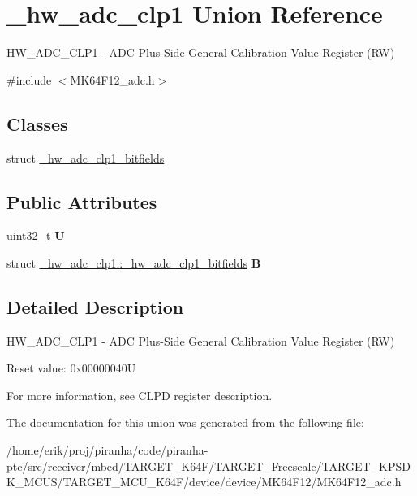 \hypertarget{union__hw__adc__clp1}{}\section{\+\_\+hw\+\_\+adc\+\_\+clp1 Union Reference}
\label{union__hw__adc__clp1}


H\+W\+\_\+\+A\+D\+C\+\_\+\+C\+L\+P1 -\/ A\+DC Plus-\/\+Side General Calibration Value Register (RW)  




{\ttfamily \#include $<$M\+K64\+F12\+\_\+adc.\+h$>$}

\subsection*{Classes}
\begin{DoxyCompactItemize}
\item 
struct \hyperlink{struct__hw__adc__clp1_1_1__hw__adc__clp1__bitfields}{\+\_\+hw\+\_\+adc\+\_\+clp1\+\_\+bitfields}
\end{DoxyCompactItemize}
\subsection*{Public Attributes}
\begin{DoxyCompactItemize}
\item 
uint32\+\_\+t {\bfseries U}\hypertarget{union__hw__adc__clp1_a59c69292c74fabab1ae97e84ba4952b6}{}\label{union__hw__adc__clp1_a59c69292c74fabab1ae97e84ba4952b6}

\item 
struct \hyperlink{struct__hw__adc__clp1_1_1__hw__adc__clp1__bitfields}{\+\_\+hw\+\_\+adc\+\_\+clp1\+::\+\_\+hw\+\_\+adc\+\_\+clp1\+\_\+bitfields} {\bfseries B}\hypertarget{union__hw__adc__clp1_aa9cb724d7a055535ba52fda75c87af63}{}\label{union__hw__adc__clp1_aa9cb724d7a055535ba52fda75c87af63}

\end{DoxyCompactItemize}


\subsection{Detailed Description}
H\+W\+\_\+\+A\+D\+C\+\_\+\+C\+L\+P1 -\/ A\+DC Plus-\/\+Side General Calibration Value Register (RW) 

Reset value\+: 0x00000040U

For more information, see C\+L\+PD register description. 

The documentation for this union was generated from the following file\+:\begin{DoxyCompactItemize}
\item 
/home/erik/proj/piranha/code/piranha-\/ptc/src/receiver/mbed/\+T\+A\+R\+G\+E\+T\+\_\+\+K64\+F/\+T\+A\+R\+G\+E\+T\+\_\+\+Freescale/\+T\+A\+R\+G\+E\+T\+\_\+\+K\+P\+S\+D\+K\+\_\+\+M\+C\+U\+S/\+T\+A\+R\+G\+E\+T\+\_\+\+M\+C\+U\+\_\+\+K64\+F/device/device/\+M\+K64\+F12/M\+K64\+F12\+\_\+adc.\+h\end{DoxyCompactItemize}
